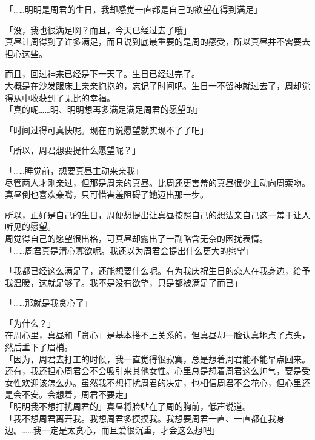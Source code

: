 「……明明是周君的生日，我却感觉一直都是自己的欲望在得到满足」

「没，我也很满足啊？而且，今天已经过去了哦」\\

真昼让周得到了许多满足，而且说到底最重要的是周的感受，所以真昼并不需要去担心这些。

而且，回过神来已经是下一天了。生日已经过完了。\\

大概是在沙发跟床上亲亲抱抱的，忘记了时间吧。生日一不留神就过去了，周却觉得从中收获到了无比的幸福。\\

「真的呢……明、明明想再多满足满足周君的愿望的」

「时间过得可真快呢。现在再说愿望就实现不了了吧」

「所以，周君想要提什么愿望呢？」

「……睡觉前，想要真昼主动来亲我」\\

尽管两人才刚亲过，但那是周亲的真昼。比周还更害羞的真昼很少主动向周索吻。真昼倒也喜欢亲嘴，只可惜害羞阻碍了她迈出那一步。

所以，正好是自己的生日，周便想提出让真昼按照自己的想法亲自己这一羞于让人听见的愿望。\\

周觉得自己的愿望很出格，可真昼却露出了一副略含无奈的困扰表情。\\

「……周君真是清心寡欲呢。我还以为周君会提出什么更大的愿望」

「我都已经这么满足了，还能想要什么呢。有为我庆祝生日的恋人在我身边，给予我温暖，这就足够了。我不是没有欲望，只是都被满足了而已」

「……那就是我贪心了」

「为什么？」\\

在周心里，真昼和「贪心」是基本搭不上关系的，但真昼却一脸认真地点了点头，然后垂下了眉梢。\\

「因为，周君去打工的时候，我一直觉得很寂寞，总是想着周君能不能早点回来。还有，我还担心周君会不会吸引来其他女性。心里总是想着周君这么帅气，要是受女性欢迎该怎么办。虽然我不想打扰周君的决定，也相信周君不会花心，但心里还是会不安。会想着，周君不要走」\\

「明明我不想打扰周君的」真昼将脸贴在了周的胸前，低声说道。\\

「我不想周君离开我。我想周君多摸摸我。我想要周君一直、一直都在我身边。……我一定是太贪心，而且爱很沉重，才会这么想吧」\\

